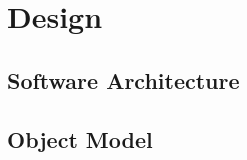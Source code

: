 \chapter{Design}
\label{Design}

\section{Software Architecture}
\label{Software Architecture}

\section{Object Model}
\label{Object Model}
